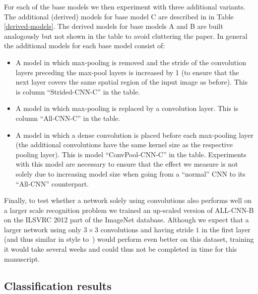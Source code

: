 \documentclass{article} %
\begin{document}
For each of the base models we then experiment with three additional variants. The additional (derived) models for base model C are described in in Table \ref{derived-models}. The derived models for base models A and B are built analogously but not shown in the table to avoid cluttering the paper. 
In general the additional models for each base model consist of:
\begin{itemize}
  \item A model in which max-pooling is removed and the stride of the convolution layers
preceding the max-pool layers is increased by 1 (to ensure that the
next layer covers the same spatial region of the input image as
before). This is column ``Strided-CNN-C'' in the table.  
  \item A model in which max-pooling is replaced by a convolution
    layer. This is column ``All-CNN-C'' in the table.
  \item A model in which a dense convolution is placed before each
    max-pooling layer (the additional convolutions have the same kernel size as
    the respective pooling layer). This is model ``ConvPool-CNN-C'' in
    the table. Experiments with this model are necessary to ensure
    that the effect we measure is not solely due to increasing model
    size when going from a ``normal'' CNN to its ``All-CNN'' counterpart.
\end{itemize}

Finally, to test whether a network solely using convolutions also
performs well on a larger scale recognition problem we trained an
up-scaled version of ALL-CNN-B on the ILSVRC 2012 part of the ImageNet
database. Although we
expect that a larger network using only $3 \times 3$ convolutions and having stride $1$ in the first layer (and 
thus similar in style to~\citet{VGG_2014}) would perform even
better on this dataset, training it would take several weeks 
and could thus not be completed in time for this manuscript.

\subsection{Classification results}
\end{document}
